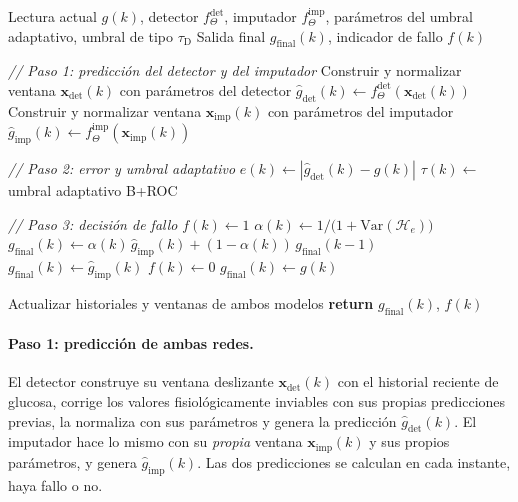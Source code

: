 \documentclass{report}
\begin{document}
\begin{algorithm}[h]
\caption{Operación en línea del pipeline desacoplado detector--imputador.}
\label{alg:pipeline}
\begin{algorithmic}[1]
\Require Lectura actual $g(k)$, detector $f_{\Theta}^{\mathrm{det}}$, imputador $f_{\Theta}^{\mathrm{imp}}$, parámetros del umbral adaptativo, umbral de tipo $\tau_{\mathrm{D}}$
\Ensure Salida final $g_{\mathrm{final}}(k)$, indicador de fallo $f(k)$

\Statex \textit{// Paso 1: predicción del detector y del imputador}
\State Construir y normalizar ventana $\mathbf{x}_{\mathrm{det}}(k)$ con parámetros del detector
\State $\hat{g}_{\mathrm{det}}(k) \gets f_{\Theta}^{\mathrm{det}}(\mathbf{x}_{\mathrm{det}}(k))$
\State Construir y normalizar ventana $\mathbf{x}_{\mathrm{imp}}(k)$ con parámetros del imputador
\State $\hat{g}_{\mathrm{imp}}(k) \gets f_{\Theta}^{\mathrm{imp}}(\mathbf{x}_{\mathrm{imp}}(k))$ 

\Statex \textit{// Paso 2: error y umbral adaptativo}
\State $e(k) \gets |\hat{g}_{\mathrm{det}}(k) - g(k)|$
\State $\tau(k) \gets$ umbral adaptativo B+ROC 

\Statex \textit{// Paso 3: decisión de fallo}
    \State $f(k) \gets 1$ 
        \State $\alpha(k) \gets 1 / \big(1 + \mathrm{Var}(\mathcal{H}_e)\big)$
        \State $g_{\mathrm{final}}(k) \gets \alpha(k)\,\hat{g}_{\mathrm{imp}}(k) + (1 - \alpha(k))\,g_{\mathrm{final}}(k\!-\!1)$
    \Else
        \State $g_{\mathrm{final}}(k) \gets \hat{g}_{\mathrm{imp}}(k)$
    \EndIf
\Else
    \State $f(k) \gets 0$ 
    \State $g_{\mathrm{final}}(k) \gets g(k)$ 
\EndIf

\State Actualizar historiales y ventanas de ambos modelos
\State \textbf{return} $g_{\mathrm{final}}(k)$, $f(k)$

\end{algorithmic}
\end{algorithm}

\paragraph{Paso 1: predicción de ambas redes.} El detector construye su ventana deslizante $\mathbf{x}_{\mathrm{det}}(k)$ con el historial reciente de glucosa, corrige los valores fisiológicamente inviables con sus propias predicciones previas, la normaliza con sus parámetros y genera la predicción $\hat{g}_{\mathrm{det}}(k)$. El imputador hace lo mismo con su \textit{propia} ventana $\mathbf{x}_{\mathrm{imp}}(k)$ y sus propios parámetros, y genera $\hat{g}_{\mathrm{imp}}(k)$. Las dos predicciones se calculan en cada instante, haya fallo o no.
\end{document}
